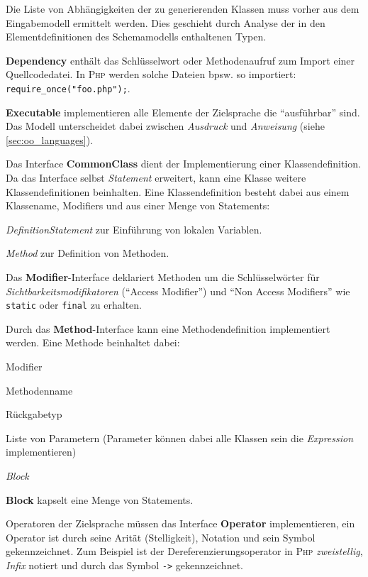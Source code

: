 Die Liste von Abhängigkeiten der zu generierenden Klassen muss vorher aus dem Eingabemodell ermittelt werden. Dies geschieht durch Analyse der in den Elementdefinitionen des Schemamodells enthaltenen Typen. 

\textbf{Dependency} enthält das Schlüsselwort oder Methodenaufruf zum Import einer Quellcodedatei. In \textsc{Php} werden solche Dateien bpsw. so importiert: \texttt{require\_once("foo.php");}.

\textbf{Executable} implementieren alle Elemente der Zielsprache die \enquote{ausführbar} sind. Das Modell unterscheidet dabei zwischen \emph{Ausdruck} und \emph{Anweisung} (siehe \cref{sec:oo_languages}). 

Das Interface \textbf{CommonClass} dient der Implementierung einer Klassendefinition. Da das Interface selbst \emph{Statement} erweitert, kann eine Klasse weitere Klassendefinitionen beinhalten. Eine Klassendefinition besteht dabei aus einem Klassename, Modifiers und aus einer Menge von Statements:
\begin{compactitem}
    \item \emph{DefinitionStatement} zur Einführung von lokalen Variablen.
    \item \emph{Method} zur Definition von Methoden.
\end{compactitem}

Das \textbf{Modifier}-Interface deklariert Methoden um die Schlüsselwörter für \emph{Sichtbarkeitsmodifikatoren} (\enquote{Access Modifier}) und \enquote{Non Access Modifiers} wie \texttt{static} oder \texttt{final} zu erhalten.

Durch das \textbf{Method}-Interface kann eine Methodendefinition implementiert werden. Eine Methode beinhaltet dabei:
\begin{compactitem}
    \item Modifier
    \item Methodenname
    \item Rückgabetyp
    \item Liste von Parametern (Parameter können dabei alle Klassen sein die \emph{Expression} implementieren) %
    \item \emph{Block}
\end{compactitem}

\textbf{Block} kapselt eine Menge von Statements.

Operatoren der Zielsprache müssen das Interface \textbf{Operator} implementieren, ein Operator ist durch seine Arität (Stelligkeit), Notation und sein Symbol gekennzeichnet. Zum Beispiel ist der Dereferenzierungsoperator in \textsc{Php} \emph{zweistellig}, \emph{Infix} notiert und durch das Symbol \texttt{->} gekennzeichnet.

